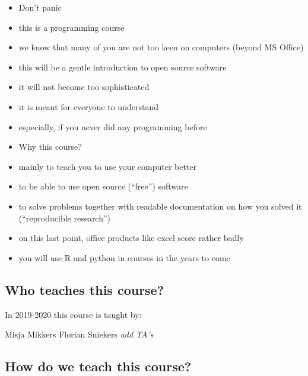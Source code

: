 \documentclass[]{book}
\providecommand{\tightlist}{%
  \setlength{\itemsep}{0pt}\setlength{\parskip}{0pt}}
\begin{document}
\begin{itemize}
\tightlist
\item
  Don't panic
\item
  this is a programming course
\item
  we know that many of you are not too keen on computers (beyond MS Office)
\item
  this will be a gentle introduction to open source software
\item
  it will not become too sophisticated
\item
  it is meant for everyone to understand
\item
  especially, if you never did any programming before
\item
  Why this course?
\item
  mainly to teach you to use your computer better
\item
  to be able to use open source (``free'') software
\item
  to solve problems together with readable documentation on how you solved it (``reproducible research'')
\item
  on this last point, office products like excel score rather badly
\item
  you will use R and python in courses in the years to come
\end{itemize}

\hypertarget{who-teaches-this-course}{%
\subsection{Who teaches this course?}\label{who-teaches-this-course}}

In 2019-2020 this course is taught by:

Misja Mikkers
Florian Sniekers
\emph{add TA's}

\hypertarget{how-do-we-teach-this-course}{%
\subsection{How do we teach this course?}\label{how-do-we-teach-this-course}}
\end{document}
